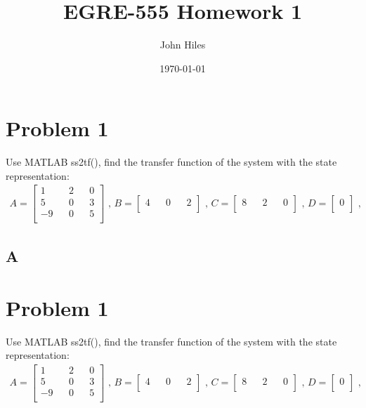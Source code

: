 \documentclass{article}
\title{EGRE-555 Homework 1}
\author{John Hiles}
\date\today
\begin{document}
\maketitle %

\section*{Problem 1}
Use MATLAB ss2tf(), find the transfer function of the system with the state representation:
\begin{align*}
A = \begin{bmatrix}
1 && 2 && 0 \\
5 && 0 && 3 \\
-9 && 0 && 5 \\ 
\end{bmatrix} \text{ , }
B = \begin{bmatrix}
4 && 0 && 2 \\
\end{bmatrix} \text{ , }
C = \begin{bmatrix}
8 && 2 && 0 \\
\end{bmatrix} \text{ , }
D = \begin{bmatrix}
0 \\
\end{bmatrix} \text{ , }
\end{align*}


\subsection*{A}
\clearpage

\section*{Problem 1}
Use MATLAB ss2tf(), find the transfer function of the system with the state representation:
\begin{align*}
A = \begin{bmatrix}
1 && 2 && 0 \\
5 && 0 && 3 \\
-9 && 0 && 5 \\ 
\end{bmatrix} \text{ , }
B = \begin{bmatrix}
4 && 0 && 2 \\
\end{bmatrix} \text{ , }
C = \begin{bmatrix}
8 && 2 && 0 \\
\end{bmatrix} \text{ , }
D = \begin{bmatrix}
0 \\
\end{bmatrix} \text{ , }
\end{align*}
\end{document}
